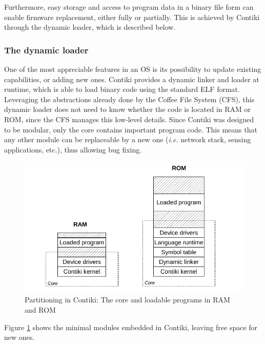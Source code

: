 Furthermore, easy storage and access to program data in a binary file form can enable firmware replacement, either fully or partially.
This is achieved by Contiki through the dynamic loader, which is described below.

\subsubsection{The dynamic loader}
One of the most appreciable features in an OS is its possibility to update existing capabilities, or adding new ones.
Contiki provides a dynamic linker and loader at runtime, which is able to load binary code using the standard ELF format\cite{tis1995tool}.
Leveraging the abstractions already done by the Coffee File System (CFS), this dynamic loader does not need to know whether the code is located in RAM or ROM, since the CFS manages this low-level details.
Since Contiki was designed to be modular, only the core contains important program code.
This means that any other module can be replaceable by a new one (\textit{i.e.} network stack, sensing applications, etc.), thus allowing bug fixing.

\begin{figure}[htb]
	\centering
	\includegraphics[width=1\columnwidth]{chapters/background.images/ContikiModules.pdf}
	\caption{Partitioning in Contiki: The core and loadable programs in RAM and ROM\cite{dunkels06runtime}}
	\label{fig:ContikiModules}
\end{figure}

Figure \ref{fig:ContikiModules} shows the minimal modules embedded in Contiki, leaving free space for new ones.

